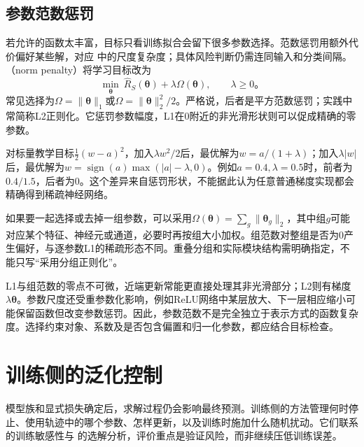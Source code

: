\subsection{参数范数惩罚}
\label{sec:generalization-norm-penalties}

若允许的函数太丰富，目标只看训练拟合会留下很多参数选择。范数惩罚用额外代价偏好某些解，对应
中的尺度复杂度；具体风险判断仍需连同输入和分类间隔。（norm penalty）将学习目标改为
\begin{equation}
  \min_{\bm\theta}\ \hat R_S(\bm\theta)+\lambda\Omega(\bm\theta),
  \qquad\lambda\geq0\text{。}
  \label{eq:generalization-regularized-objective}
\end{equation}
常见选择为$\Omega=\lVert\bm\theta\rVert_1$或$\Omega=\lVert\bm\theta\rVert_2^2/2$。严格说，后者是平方范数惩罚；实践中常简称L2正则化。它惩罚参数幅度，L1在0附近的非光滑形状则可以促成精确的零参数。

\begin{example}[L1与L2的收缩不同]
  \label{ex:generalization-shrinkage}
  对标量教学目标$\tfrac12(w-a)^2$，加入$\lambda w^2/2$后，最优解为$w=a/(1+\lambda)$；加入$\lambda|w|$后，最优解为$w=\operatorname{sign}(a)\max(|a|-\lambda,0)$。例如$a=0.4,\lambda=0.5$时，前者为$0.4/1.5$，后者为0。这个差异来自惩罚形状，不能据此认为任意普通梯度实现都会精确得到稀疏神经网络。
\end{example}

如果要一起选择或去掉一组参数，可以采用$\Omega(\bm\theta)=\sum_g\lVert\bm\theta_g\rVert_2$，其中组$g$可能对应某个特征、神经元或通道，必要时再按组大小加权。组范数对整组是否为0产生偏好，与逐参数L1的稀疏形态不同。重叠分组和实际模块结构需明确指定，不能只写“采用分组正则化”。

L1与组范数的零点不可微，近端更新常能更直接处理其非光滑部分；L2则有梯度$\lambda\bm\theta$。参数尺度还受重参数化影响，例如ReLU网络中某层放大、下一层相应缩小可能保留函数但改变参数惩罚。因此，参数范数不是完全独立于表示方式的函数复杂度。选择约束对象、系数及是否包含偏置和归一化参数，都应结合目标检查。

\section{训练侧的泛化控制}
\label{sec:generalization-training-process}

模型族和显式损失确定后，求解过程仍会影响最终预测。训练侧的方法管理何时停止、使用轨迹中的哪个参数、怎样更新，以及训练时施加什么随机扰动。它们联系
的训练敏感性与
的选解分析，评价重点是验证风险，而非继续压低训练误差。

